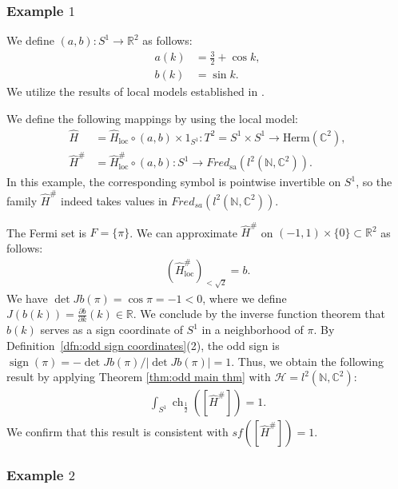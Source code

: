 \documentclass{amsart}
\theoremstyle{definition}
\theoremstyle{remark}
\begin{document}
\subsubsection{Example $1$}
\label{subsubsec:example1}

We define $(a, b) \colon S^1 \to \mathbb{R}^2$ as follows:
\begin{align*}
    a(k) &= \frac{3}{2} + \cos k, \\
    b(k) &= \sin k.
\end{align*}
We utilize the results of local models established in \cite{G1}.

We define the following mappings by using the local model:
\begin{align*}
    \hat{H} &= \hat{H}_{\text{loc}} \circ (a, b) \times 1_{S^1} \colon T^2 = S^1 \times S^1 \to \text{Herm}(\mathbb{C}^2), \\
    \hat{H}^{\#} &= \hat{H}^{\#}_{\text{loc}} \circ (a, b) \colon S^1 \to Fred_{\text{sa}}(l^2(\mathbb{N}, \mathbb{C}^2)).
\end{align*}
In this example, the corresponding symbol is pointwise invertible on $S^1$, so the family $\hat H^\#$ indeed takes values in $Fred_{sa}(l^2(\mathbb N,\mathbb C^2))$.

The Fermi set is $F = \{\pi\}$. 
We can approximate $\hat{H}^{\#}$ on $(-1, 1) \times \{0\} \subset \mathbb{R}^2$ as follows:
\begin{align*}
    (\hat{H}^{\#}_{\text{loc}})_{<\sqrt{2}} = b.
\end{align*}
We have $\det Jb(\pi) = \cos \pi = -1 < 0$, where we define $J(b(k)) = \frac{\partial b}{\partial k}(k) \in \mathbb{R}$. We conclude by the inverse function theorem that $b(k)$ serves as a sign coordinate of $S^1$ in a neighborhood of $\pi$.  
By Definition~\ref{dfn:odd sign coordinates}(2), the odd sign is $\operatorname{sign}(\pi)=-\det Jb(\pi)/|\det Jb(\pi)|=1$.
Thus, we obtain the following result by applying Theorem \ref{thm:odd main thm} with $\mathcal{H} = l^2(\mathbb{N}, \mathbb{C}^2)$:
\begin{align*}
    \int_{S^1} \operatorname{ch}_{\frac{1}{2}}([\hat{H}^{\#}]) = 1.
\end{align*}
We confirm that this result is consistent with $sf([\hat{H}^{\#}]) = 1$. 

\subsubsection{Example $2$}
\label{subsubsec:example2}
\end{document}
